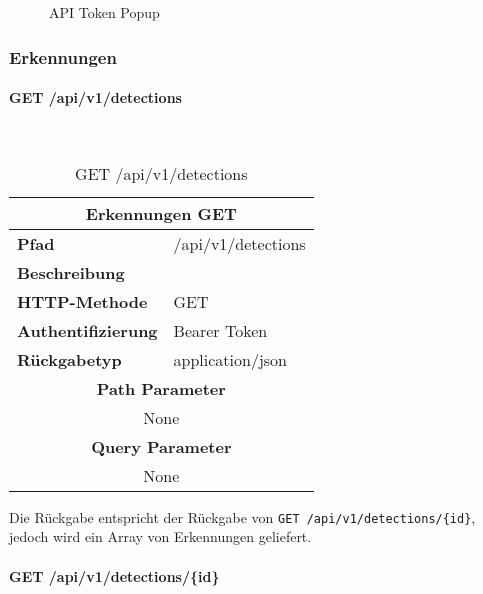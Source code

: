\begin{figure}[H]
  \centering
  \caption{API Token Popup}
\end{figure}

\subsubsection{Erkennungen}
\paragraph{GET /api/v1/detections}\mbox{}\\

\begin{table}[H]
  \centering
  \begin{tabular}{|l|l|}
  \hline
  \multicolumn{2}{|c|}{\textbf{Erkennungen GET}} \\ \hline
  \textbf{Pfad}                & /api/v1/detections  \\ \hline
  \textbf{Beschreibung}        &                     \\ \hline
  \textbf{HTTP-Methode}        & GET                 \\ \hline
  \textbf{Authentifizierung}   & Bearer Token        \\ \hline
  \textbf{Rückgabetyp}         & application/json    \\ \hline
  \multicolumn{2}{|c|}{\textbf{Path Parameter}}                      \\ \hline
  \multicolumn{2}{|c|}{None}          \\ \hline
  \multicolumn{2}{|c|}{\textbf{Query Parameter}}                      \\ \hline
  \multicolumn{2}{|c|}{None}          \\ \hline
  \end{tabular}
  \caption{GET /api/v1/detections}
\end{table}

Die Rückgabe entspricht der Rückgabe von \verb|GET /api/v1/detections/{id}|, jedoch wird ein
Array von Erkennungen geliefert.

\paragraph{GET /api/v1/detections/\{id\}}\mbox{}\\

